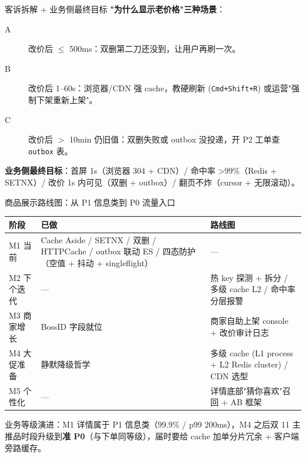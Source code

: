 \documentclass[aspectratio=169,11pt]{beamer}
\begin{document}
\begin{frame}[shrink]{客诉拆解 + 业务侧最终目标}
\textbf{"为什么显示老价格"三种场景}：
\begin{description}
  \item[A] 改价后 $\le$ 500ms：双删第二刀还没到，让用户再刷一次。
  \item[B] 改价后 1--60s：浏览器/CDN 强 cache，教硬刷新 (\texttt{Cmd+Shift+R}) 或运营"强制下架重新上架"。
  \item[C] 改价后 $>$ 10min 仍旧值：双删失败或 outbox 没投递，开 P2 工单查 \texttt{outbox} 表。
\end{description}
\vspace{2mm}
\textbf{业务侧最终目标}：首屏 1s（浏览器 304 + CDN）/ 命中率 \textgreater 99\%（Redis + SETNX）/ 改价 1s 内可见（双删 + outbox）/ 翻页不炸（cursor + 无限滚动）。
\end{frame}

\begin{frame}[shrink]{商品展示路线图：从 P1 信息类到 P0 流量入口}
\begin{tabular}{@{}p{20mm}p{42mm}p{36mm}@{}}
\toprule
阶段 & 已做 & 路线图 \\
\midrule
M1 当前 & Cache Aside / SETNX / 双删 / HTTPCache / outbox 联动 ES / 四态防护（空值 + 抖动 + singleflight） & — \\
M2 下个迭代 & — & 热 key 探测 + 拆分 / 多级 cache L2 / 命中率分层报警 \\
M3 商家增长 & BossID 字段就位 & 商家自助上架 console + 改价审计日志 \\
M4 大促准备 & 静默降级哲学 & 多级 cache (L1 process + L2 Redis cluster) / CDN 选型 \\
M5 个性化 & — & 详情底部"猜你喜欢"召回 + AB 框架 \\
\bottomrule
\end{tabular}
\vspace{2mm}
\small 业务等级演进：M1 详情属于 P1 信息类（99.9\% / p99 200ms），M4 之后双 11 主推品时段升级到\textbf{准 P0}（与下单同等级），届时要给 cache 加单分片冗余 + 客户端旁路缓存。
\end{frame}

\appendix
\end{document}

